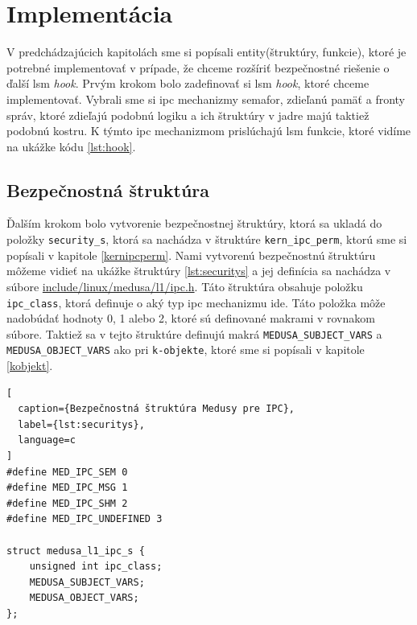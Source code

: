 \section{Implementácia}
V predchádzajúcich kapitolách sme si popísali entity(štruktúry, funkcie), ktoré je potrebné implementovať v prípade, že chceme rozšíriť bezpečnostné riešenie o ďalší \acrshort{lsm} \textit{hook}. Prvým krokom bolo zadefinovať si \acrshort{lsm} \textit{hook}, ktoré chceme implementovať. Vybrali sme si \acrshort{ipc} mechanizmy semafor, zdieľanú pamäť a fronty správ, ktoré zdieľajú podobnú logiku a ich štruktúry v jadre majú taktiež podobnú kostru. K týmto \acrshort{ipc} mechanizmom prislúchajú \acrshort{lsm} funkcie, ktoré vidíme na ukážke kódu \ref{lst:hook}. 
\subsection{Bezpečnostná štruktúra} \label{securitys}
Ďalším krokom bolo vytvorenie bezpečnostnej štruktúry, ktorá sa ukladá do položky \texttt{security\_s}, ktorá sa nachádza v štruktúre \texttt{kern\_ipc\_perm}, ktorú sme si popísali v kapitole \ref{kernipcperm}. Nami vytvorenú bezpečnostnú štruktúru môžeme vidieť na ukážke štruktúry \ref{lst:securitys} a  jej definícia sa nachádza v súbore \url{include/linux/medusa/l1/ipc.h}. Táto štruktúra obsahuje položku \texttt{ipc\_class}, ktorá definuje o aký typ \acrshort{ipc} mechanizmu ide. Táto položka môže nadobúdať hodnoty 0, 1 alebo 2, ktoré sú definované makrami v rovnakom súbore. Taktiež sa v tejto štruktúre definujú makrá \texttt{MEDUSA\_SUBJECT\_VARS} a \texttt{MEDUSA\_OBJECT\_VARS} ako pri \texttt{k-objekte}, ktoré sme si popísali v kapitole \ref{kobjekt}. 
\begin{lstlisting}[
  caption={Bezpečnostná štruktúra Medusy pre IPC},
  label={lst:securitys},
  language=c
]
#define MED_IPC_SEM 0
#define MED_IPC_MSG 1
#define MED_IPC_SHM 2
#define MED_IPC_UNDEFINED 3

struct medusa_l1_ipc_s {
	unsigned int ipc_class;
	MEDUSA_SUBJECT_VARS;
	MEDUSA_OBJECT_VARS;
};
\end{lstlisting} 

